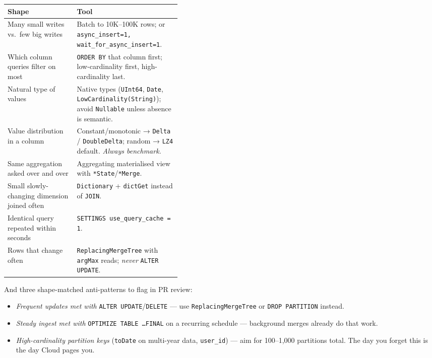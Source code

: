 \documentclass[11pt]{article}
\renewcommand{\arraystretch}{1.15}
\begin{document}
\medskip
\renewcommand{\arraystretch}{1.20}
\begin{tabularx}{\linewidth}{@{}p{0.40\linewidth} X@{}}
\toprule
\textbf{Shape}                                 & \textbf{Tool}\\
\midrule
Many small writes vs.\ few big writes          & Batch to 10K--100K rows; or
                                                 \texttt{async\_insert=1, wait\_for\_async\_insert=1}.\\
Which column queries filter on most            & \texttt{ORDER BY} that
                                                 column first; low-cardinality
                                                 first, high-cardinality last.\\
Natural type of values                         & Native types
                                                 (\texttt{UInt64}, \texttt{Date},
                                                 \texttt{LowCardinality(String)}); avoid
                                                 \texttt{Nullable} unless absence is semantic.\\
Value distribution in a column                 & Constant/monotonic →
                                                 \texttt{Delta} / \texttt{DoubleDelta};
                                                 random → \texttt{LZ4} default.
                                                 \emph{Always benchmark.}\\
Same aggregation asked over and over           & Aggregating materialised view
                                                 with \texttt{*State}/\texttt{*Merge}.\\
Small slowly-changing dimension joined often   & \texttt{Dictionary} +
                                                 \texttt{dictGet} instead of \texttt{JOIN}.\\
Identical query repeated within seconds        & \texttt{SETTINGS use\_query\_cache = 1}.\\
Rows that change often                         & \texttt{ReplacingMergeTree}
                                                 with \texttt{argMax} reads;
                                                 \emph{never} \texttt{ALTER UPDATE}.\\
\bottomrule
\end{tabularx}

\medskip
And three shape-matched anti-patterns to flag in PR review:
\begin{itemize}
\setlength\itemsep{0pt}
\item \emph{Frequent updates met with} \texttt{ALTER UPDATE}/\texttt{DELETE} ---
      use \texttt{ReplacingMergeTree} or \texttt{DROP PARTITION} instead.
\item \emph{Steady ingest met with} \texttt{OPTIMIZE TABLE \ldots FINAL} on a
      recurring schedule --- background merges already do that work.
\item \emph{High-cardinality partition keys}
      (\texttt{toDate} on multi-year data, \texttt{user\_id}) --- aim for
      100--1{,}000 partitions total. The day you forget this is the day
      Cloud pages you.
\end{itemize}
\end{document}

